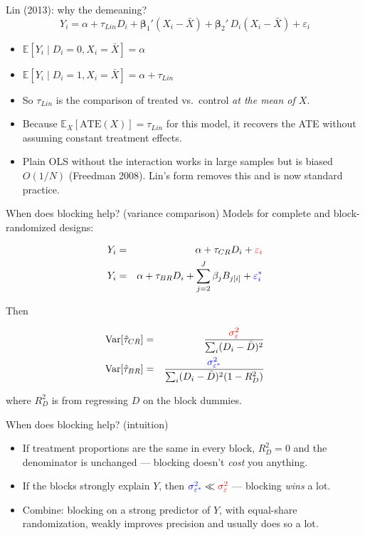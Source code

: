 \documentclass[xcolor=dvipsnames]{beamer}
\renewcommand{\epsilon}{\varepsilon}
\newcommand\E{\mathbb{E}}
\newcommand\be{{\bm\beta}}
\newcommand{\Var}{\mathrm{Var}}
\begin{document}
\begin{frame}{Lin (2013): why the demeaning?}
\small
\[
Y_i = \alpha + \tau_{Lin} D_i + \be_1' (X_i - \bar X) +
\be_2' \, D_i (X_i - \bar X) + \epsilon_i
\]
\begin{itemize}
\footnotesize
\item $\E[Y_i \mid D_i = 0, X_i = \bar X] = \alpha$
\item $\E[Y_i \mid D_i = 1, X_i = \bar X] = \alpha + \tau_{Lin}$
\item So $\tau_{Lin}$ is the comparison of treated vs.\ control
  \textit{at the mean of $X$}.
\item Because $\E_X[\text{ATE}(X)] = \tau_{Lin}$ for this model, it
  recovers the ATE without assuming constant treatment effects.
\item Plain OLS without the interaction works in large samples but is
  biased $O(1/N)$ (Freedman 2008). Lin's form removes this and is now
  standard practice.
\end{itemize}
\end{frame}


\begin{frame}{When does blocking help? (variance comparison)}
\small Models for complete and block-randomized designs:
\begin{small}
\begin{eqnarray*}
Y_i &=& \alpha + \tau_{CR} D_i + \textcolor{red}{\varepsilon_i} \\
Y_i &=& \alpha + \tau_{BR} D_i + \sum_{j=2}^J \beta_j B_{j[i]} +
        \textcolor{blue}{\varepsilon^{*}_i}
\end{eqnarray*}
\end{small}
Then
\begin{small}
\begin{eqnarray*}
\Var[\hat\tau_{CR}] &=&
  \frac{\textcolor{red}{\sigma^2_\varepsilon}}
       {\sum_i (D_i - \bar D)^2} \\
\Var[\hat\tau_{BR}] &=&
  \frac{\textcolor{blue}{\sigma^2_{\varepsilon^*}}}
       {\sum_i (D_i - \bar D)^2 (1 - R_D^2)}
\end{eqnarray*}
\end{small}
where $R_D^2$ is from regressing $D$ on the block dummies.
\end{frame}


\begin{frame}{When does blocking help? (intuition)}
\small
\begin{itemize}
\item If treatment proportions are the same in every block, $R_D^2 = 0$
  and the denominator is unchanged --- blocking doesn't \textit{cost} you
  anything.
\item If the blocks strongly explain $Y$, then
  $\textcolor{blue}{\sigma^2_{\varepsilon^*}} \ll
   \textcolor{red}{\sigma^2_\varepsilon}$ --- blocking \textit{wins} a lot.
\item Combine: blocking on a strong predictor of $Y$, with equal-share
  randomization, weakly improves precision and usually does so a lot.
\end{itemize}
\end{frame}
\end{document}
